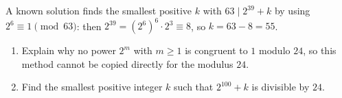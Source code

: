 A known solution finds the smallest positive $k$ with $63\mid 2^{39}+k$ by using $2^6\equiv1\pmod{63}$: then $2^{39}=\left(2^6\right)^6\cdot2^3\equiv8$, so $k=63-8=55$.
\begin{enumerate}
\item[(a)] Explain why no power $2^m$ with $m\ge1$ is congruent to $1$ modulo $24$, so this method cannot be copied directly for the modulus $24$.
\item[(b)] Find the smallest positive integer $k$ such that $2^{100}+k$ is divisible by $24$.
\end{enumerate}
